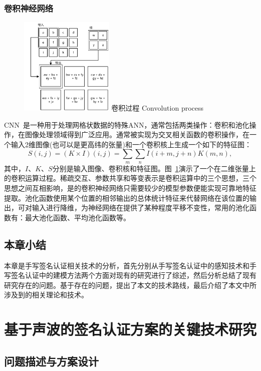 \subsection{卷积神经网络}
\begin{figure}[!htp]
  \centering
  \includegraphics[width=0.4\textwidth]{figure/convolution-process.pdf}
  \bicaption
    {卷积过程}
    {Convolution process}
  \label{fig:convolution-process}
\end{figure}
CNN~\cite{goodfellow2016deep}是一种用于处理网格状数据的特殊ANN，通常包括两类操作：卷积和池化操作，在图像处理领域得到广泛应用。通常被实现为交叉相关函数的卷积操作，在一个输入2维图像(也可以是更高纬的张量)和一个卷积核上生成一个如下的特征图：
$$
S(i,j)=(K\times I)(i,j)=\sum_{m}\sum_{n}I(i+m,j+n)K(m,n),
$$
其中，$I$、$K$、$S$分别是输入图像、卷积核和特征图。图~\ref{fig:convolution-process}演示了一个在二维张量上的卷积运算过程。稀疏交互、参数共享和等变表示是卷积运算中的三个思想，三个思想之间互相影响，是的卷积神经网络只需要较少的模型参数便能实现可靠地特征提取。池化函数使用某个位置的相邻输出的总体统计特征来代替网络在该位置的输出，可对输入进行降维，为神经网络在提供了某种程度平移不变性，常用的池化函数有：最大池化函数、平均池化函数等。


\section{本章小结}
本章是手写签名认证相关技术的分析，首先分别从手写签名认证中的感知技术和手写签名认证中的建模方法两个方面对现有的研究进行了综述，然后分析总结了现有研究存在的问题。基于存在的问题，提出了本文的技术路线，最后介绍了本文中所涉及到的相关理论和技术。

\chapter{基于声波的签名认证方案的关键技术研究}
\section{问题描述与方案设计}
